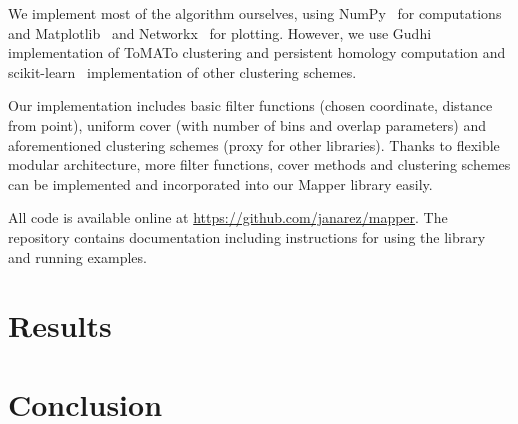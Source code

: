\documentclass{article}
\begin{document}
We implement most of the algorithm ourselves, using NumPy~\cite{numpy} for computations and Matplotlib~\cite{matplotlib} and Networkx~\cite{networkx} for plotting.
However, we use Gudhi~\cite{gudhi} implementation of ToMATo clustering and persistent homology computation and scikit-learn~\cite{scikit} implementation of other clustering schemes.

Our implementation includes basic filter functions (chosen coordinate, distance from point), uniform cover (with number of bins and overlap parameters) and aforementioned clustering schemes (proxy for other libraries).
Thanks to flexible modular architecture, more filter functions, cover methods and clustering schemes can be implemented and incorporated into our Mapper library easily.

All code is available online at \url{https://github.com/janarez/mapper}.
The repository contains documentation including instructions for using the library and running examples.

\section{Results}\label{sec:res}

\section{Conclusion}\label{sec:concl}



\end{document}
